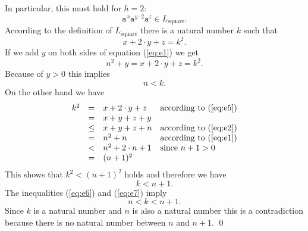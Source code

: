 In particular, this must hold for $h=2$:
\[ \mathtt{a}^x\mathtt{a}^{y\cdot 2}\mathtt{a}^z \in L_{\mathrm{square}}.  \]
According to the definition of $L_{\mathrm{square}}$ there is a natural number $k$ such that
\begin{equation}
  \label{eq:e5}
  x + 2\cdot y + z = k^2.
\end{equation}
If we add $y$ on both sides of equation (\ref{eq:e1}) we get
\[ n^2 + y = x + 2\cdot y + z = k^2. \]
Because of $y > 0$ this implies
\begin{equation}
  \label{eq:e6}
  n < k.    
\end{equation}
On the other hand we have
\[ 
\begin{array}[t]{lcll}
 k^2  & =    & x + 2 \cdot y + z       & \mbox{according to (\ref{eq:e5}})   \\
      & =    & x + y + z + y           &                                       \\
      & \leq & x + y + z + n           & \mbox{according to (\ref{eq:e2}}) \\
      & =    & n^2 + n                 & \mbox{according to (\ref{eq:e1}})   \\
      & <    & n^2 + 2 \cdot n + 1     & \mbox{since $n+1 > 0$}                   \\ 
      & =    & (n + 1)^2               
\end{array}
\]
This shows that  $k^2 < (n+1)^2$ holds and therefore we have
\begin{equation}
  \label{eq:e7}
  k < n+1.
\end{equation}
The inequalities (\ref{eq:e6}) and (\ref{eq:e7}) imply
\[ n < k < n + 1. \]
Since $k$ is a natural number and $n$ is also a natural number this is a contradiction because there is no
natural number between  $n$ and $n+1$.
\qed


